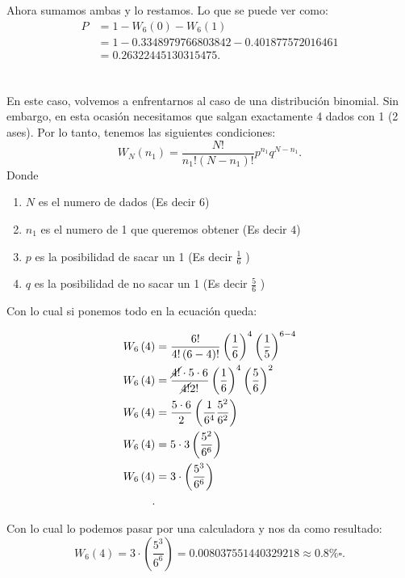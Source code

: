 \documentclass{report}
\begin{document}
Ahora sumamos ambas y lo restamos. Lo que se puede ver como:
\begin{align*}
  P &= 1 - W_6\left( 0 \right) - W_6\left( 1 \right) \\
  &= 1 - 0.3348979766803842 - 0.401877572016461 \\
  &= 0.26322445130315475
.\end{align*}

\section{}

En este caso, volvemos a enfrentarnos al caso de una distribución binomial. Sin embargo, en esta ocasión necesitamos que salgan exactamente 4 dados con 1 (2 ases). Por lo tanto, tenemos las siguientes condiciones: \[
W_N\left( n_1 \right) = \frac{N!}{n_1!\left( N-n_1 \right)!}p^{n_1}q^{N - n_1}
.\] Donde
\begin{enumerate}
  \item $N$ es el numero de dados (Es decir $6$)
  \item $n_1$ es el numero de 1 que queremos obtener (Es decir $4$)
  \item $p$ es la posibilidad de sacar un 1 (Es decir $\frac{1}{6}$ )
  \item $q$ es la posibilidad de no sacar un 1 (Es decir  $\frac{5}{6}$ )
\end{enumerate}

Con lo cual si ponemos todo en la ecuación queda:

\begin{align*}
  W_6\left( 4 \right) &= \frac{6!}{4!\left( 6 - 4 \right)!}\left( \frac{1}{6} \right) ^{4} \left( \frac{1}{5} \right) ^{6-4} \\
  W_6\left( 4 \right) &= \frac{\cancel{4!} \cdot 5 \cdot 6}{\cancel{4!}2!}\left( \frac{1}{6} \right)^{4}\left( \frac{5}{6} \right)^{2} \\
  W_6\left( 4 \right) &= \frac{5\cdot 6}{2}\left( \frac{1}{6^{4}}\frac{5^2}{6^2} \right)  \\
  W_6\left( 4 \right) &= 5\cdot 3 \left( \frac{5^2}{6^{6}} \right)  \\
  W_6\left( 4 \right) &= 3\cdot \left( \frac{5^{3}}{6^{6}} \right)  \\
.\end{align*}

Con lo cual lo podemos pasar por una calculadora y nos da como resultado: \[
W_6\left( 4 \right) = 3 \cdot \left( \frac{5^{3}}{6^{6}} \right) = 0.008037551440329218 \approx 0.8\% \square
.\] 
\end{document}
